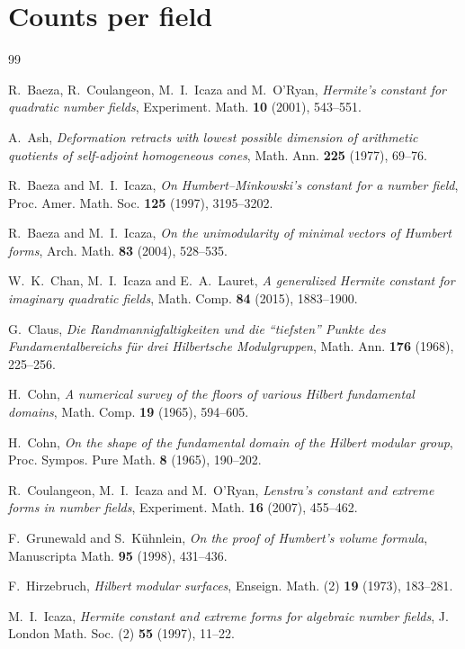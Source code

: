 \documentclass[11pt]{amsart}
\theoremstyle{definition}
\theoremstyle{remark}
\begin{document}
\appendix
\section{Counts per field}\label{app:table}


\begin{thebibliography}{99}

R.~Baeza, R.~Coulangeon, M.~I.~Icaza and M.~O'Ryan, \emph{Hermite's constant for quadratic number
fields}, Experiment. Math. \textbf{10} (2001), 543--551.

A.~Ash, \emph{Deformation retracts with lowest possible dimension of arithmetic quotients of
self-adjoint homogeneous cones}, Math. Ann. \textbf{225} (1977), 69--76.

R.~Baeza and M.~I.~Icaza, \emph{On Humbert--Minkowski's constant for a number field}, Proc. Amer.
Math. Soc. \textbf{125} (1997), 3195--3202.

R.~Baeza and M.~I.~Icaza, \emph{On the unimodularity of minimal vectors of Humbert forms}, Arch.
Math. \textbf{83} (2004), 528--535.

W.~K.~Chan, M.~I.~Icaza and E.~A.~Lauret, \emph{A generalized Hermite constant for imaginary
quadratic fields}, Math. Comp. \textbf{84} (2015), 1883--1900.

G.~Claus, \emph{Die Randmannigfaltigkeiten und die ``tiefsten'' Punkte des Fundamentalbereichs f\"ur
drei Hilbertsche Modulgruppen}, Math. Ann. \textbf{176} (1968), 225--256.

H.~Cohn, \emph{A numerical survey of the floors of various Hilbert fundamental domains}, Math.
Comp. \textbf{19} (1965), 594--605.

H.~Cohn, \emph{On the shape of the fundamental domain of the Hilbert modular group}, Proc. Sympos.
Pure Math. \textbf{8} (1965), 190--202.

R.~Coulangeon, M.~I.~Icaza and M.~O'Ryan, \emph{Lenstra's constant and extreme forms in number
fields}, Experiment. Math. \textbf{16} (2007), 455--462.

F.~Grunewald and S.~K\"uhnlein, \emph{On the proof of Humbert's volume formula}, Manuscripta Math.
\textbf{95} (1998), 431--436.

F.~Hirzebruch, \emph{Hilbert modular surfaces}, Enseign. Math. (2) \textbf{19} (1973), 183--281.

M.~I.~Icaza, \emph{Hermite constant and extreme forms for algebraic number fields}, J. London Math.
Soc. (2) \textbf{55} (1997), 11--22.


\end{thebibliography}
\end{document}
